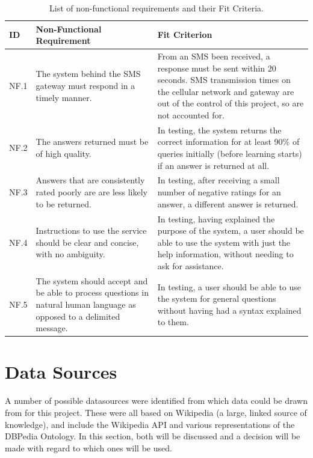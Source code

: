 \documentclass[authoryearcitations]{UoYCSproject}
\begin{document}
\begin{table}
\begin{center}
    \begin{tabular}{| p{0.8cm} | p{6.0cm} | p{6.0cm} |}
    \hline
    ID & Non-Functional Requirement & Fit Criterion \\ \hline
    NF.1 & The system behind the SMS gateway must respond in a timely manner.  & From an SMS been received, a response must be sent within 20 seconds.  SMS transmission times on the cellular network and gateway are out of the control of this project, so are not accounted for. \\ \hline
    NF.2 & The answers returned must be of high quality.  & In testing, the system returns the correct information for at least 90\% of queries initially (before learning starts) if an answer is returned at all. \\ \hline
    NF.3 & Answers that are consistently rated poorly are are less likely to be returned. & In testing, after receiving a small number of negative ratings for an answer, a different answer is returned. \\ \hline
    NF.4 &Instructions to use the service should be clear and concise, with no ambiguity.  & In testing, having explained the purpose of the system, a user should be able to use the system with just the help information, without needing to ask for assistance. \\ \hline  
    NF.5 &The system should accept and be able to process questions in natural human language as opposed to a delimited message. & In testing, a user should be able to use the system for general questions without having had a syntax explained to them. \\ \hline
    \end{tabular}
    \caption{List of non-functional requirements and their Fit Criteria.}
    \label{table:nonFunctionalRequirementsFitCrit}
\end{center}
\end{table}

\section{Data Sources}
A number of possible datasources were identified from which data could be drawn from for this project.  These were all based on Wikipedia (a large, linked source of knowledge), and include the Wikipedia API and various representations of the DBPedia Ontology.  In this section, both will be discussed and a decision will be made with regard to which ones will be used.
\end{document}
